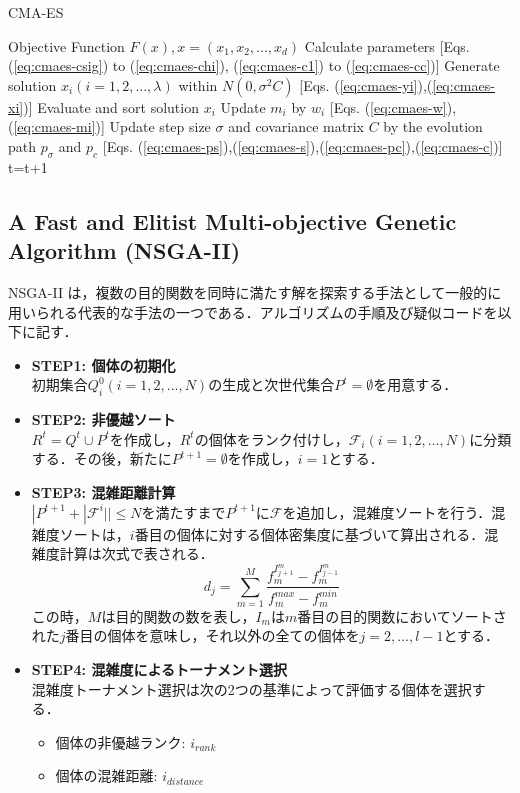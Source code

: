 \documentclass[a4j,11pt]{jarticle}
\begin{document}
\begin{algorithm}[H]
\caption{CMA-ES}
\label{code:cma-es}
\begin{algorithmic}[5]
\REQUIRE Objective Function $F(x), x=(x_1,x_2,...,x_d)$
\STATE Calculate parameters [Eqs. (\ref{eq:cmaes-csig}) to (\ref{eq:cmaes-chi}), (\ref{eq:cmaes-c1}) to (\ref{eq:cmaes-cc})]
\STATE Generate solution $x_i (i=1,2,...,\lambda)$ within $N(0, \sigma^2 C)$ [Eqs. (\ref{eq:cmaes-yi}),(\ref{eq:cmaes-xi})]
\ENDFOR
\STATE Evaluate and sort solution $x_i$
\STATE Update $m_i$ by $w_i$ [Eqs. (\ref{eq:cmaes-w}),(\ref{eq:cmaes-mi})]
\STATE Update step size $\sigma$ and covariance matrix $C$ by the evolution path $p_{\sigma}$ and $p_c$ [Eqs. (\ref{eq:cmaes-ps}),(\ref{eq:cmaes-s}),(\ref{eq:cmaes-pc}),(\ref{eq:cmaes-c})]
\ENDFOR
\STATE t=t+1
\ENDWHILE
\end{algorithmic}
\end{algorithm}

\subsection{A Fast and Elitist Multi-objective Genetic Algorithm (NSGA-II)}
\label{ss:nsga}
NSGA-II \cite{NSGAII} は，複数の目的関数を同時に満たす解を探索する手法として一般的に用いられる代表的な手法の一つである．アルゴリズムの手順及び疑似コードを以下に記す．

\begin{itemize}
\item {\bf STEP1: 個体の初期化} \\
初期集合$Q_i^0 (i=1,2,...,N)$の生成と次世代集合$P^t=\emptyset$を用意する．
\item {\bf STEP2: 非優越ソート}\\
$R^t=Q^t \cup P^t$を作成し，$R^t$の個体をランク付けし，$\mathcal{F}_i (i=1,2,...,N)$に分類する．その後，新たに$P^{t+1}=\emptyset$を作成し，$i=1$とする．
\item {\bf STEP3: 混雑距離計算}\\
$|P^{t+1}+|\mathcal{F}^i||\leq N$を満たすまで$P^{t+1}$に$\mathcal{F}$を追加し，混雑度ソートを行う．混雑度ソートは，$i$番目の個体に対する個体密集度に基づいて算出される．混雑度計算は次式で表される．
\begin{equation}
\label{eq:nsga-crowd}
d_j = \sum_{m=1}^M \frac{f_m^{I^{m}_{j+1}}-f_m^{I^{m}_{j-1}}}{f_m^{max}-f_m^{min}}
\end{equation}
この時，$M$は目的関数の数を表し，$I_m$は$m$番目の目的関数においてソートされた$j$番目の個体を意味し，それ以外の全ての個体を$j=2,...,l-1$とする．
\item {\bf STEP4: 混雑度によるトーナメント選択}\\
混雑度トーナメント選択は次の2つの基準によって評価する個体を選択する．
\begin{itemize}
  \item 個体の非優越ランク: $i_{rank}$
  \item 個体の混雑距離: $i_{distance}$
\end{itemize}
\end{itemize}
\end{document}
